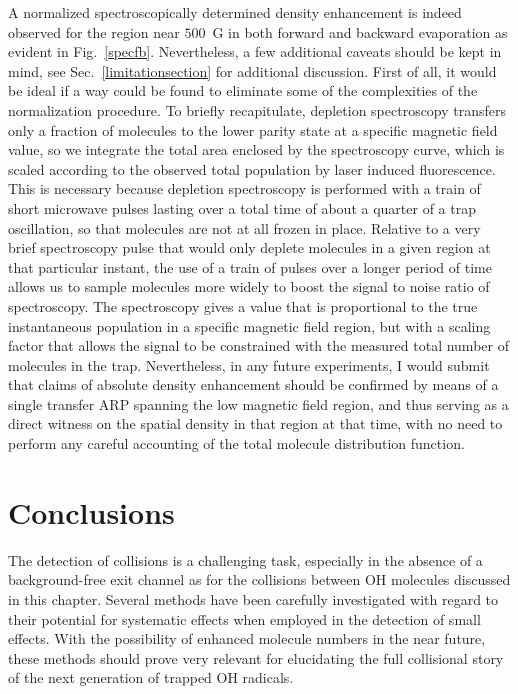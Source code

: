 A normalized spectroscopically determined density enhancement is indeed observed for the region near $500$~G in both forward and backward evaporation as evident in Fig.~\ref{specfb}.
Nevertheless, a few additional caveats should be kept in mind, see Sec.~\ref{limitationsection} for additional discussion.
First of all, it would be ideal if a way could be found to eliminate some of the complexities of the normalization procedure.
To briefly recapitulate, depletion spectroscopy transfers only a fraction of molecules to the lower parity state at a specific magnetic field value, so we integrate the total area enclosed by the spectroscopy curve, which is scaled according to the observed total population by laser induced fluorescence.  
This is necessary because depletion spectroscopy is performed with a train of short microwave pulses lasting over a total time of about a quarter of a trap oscillation, so that molecules are not at all frozen in place. 
Relative to a very brief spectroscopy pulse that would only deplete molecules in a given region at that particular instant, the use of a train of pulses over a longer period of time allows us to sample molecules more widely to boost the signal to noise ratio of spectroscopy. 
The spectroscopy gives a value that is proportional to the true instantaneous population in a specific magnetic field region, but with a scaling factor that allows the signal to be constrained with the measured total number of molecules in the trap.
Nevertheless, in any future experiments, I would submit that claims of absolute density enhancement should be confirmed by means of a single transfer ARP spanning the low magnetic field region, and thus serving as a direct witness on the spatial density in that region at that time, with no need to perform any careful accounting of the total molecule distribution function.

\section{Conclusions}

The detection of collisions is a challenging task, especially in the absence of a background-free exit channel as for the collisions between OH molecules discussed in this chapter.
Several methods have been carefully investigated with regard to their potential for systematic effects when employed in the detection of small effects.
With the possibility of enhanced molecule numbers in the near future, these methods should prove very relevant for elucidating the full collisional story of the next generation of trapped OH radicals.


\ifx\justbeingincluded\undefined

\fi

